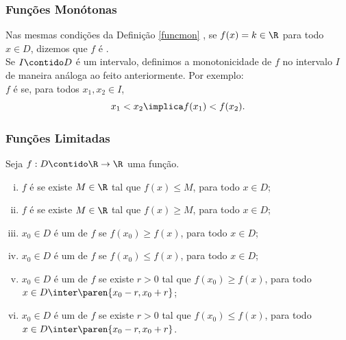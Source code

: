 \documentclass[10pt]{beamer}
\begin{document}
\begin{frame}
\frametitle{Funções Monótonas} 



Nas mesmas condições da Definição \ref{funcmon} , se $f(x) = k \in
\R$ para todo $x \in D$, dizemos que $f$ é .\\ \pause
Se $I \contido D$ é um intervalo, definimos a monotonicidade de $f$
no intervalo $I$ de maneira análoga ao feito anteriormente. Por
exemplo: \\
$f$ é  se, para todos
$x_1, x_2 \in I$,
	$$x_1 < x_2 \implica f(x_1) < f(x_2).$$


\end{frame}




\begin{frame}
\frametitle{Funções Limitadas} 

\begin{definicao}
Seja $f: D \contido \R \to \R$ uma função.
\begin{enumerate}[(i)]
	\item $f$ é  se existe $M \in \R$ tal
	que $f(x) \leq M$, para todo $x \in D$;
	\item $f$ é  se existe $M \in \R$ tal
	que $f(x) \geq M$, para todo $x \in D$;
	\item $x_0 \in D$ é um  de $f$ se
	$f(x_0) \geq f(x)$, para todo $x \in D$;
	\item $x_0 \in D$ é um  de $f$ se
	$f(x_0) \leq f(x)$, para todo $x \in D$;
	\item $x_0 \in D$ é um  de $f$ se
	existe $r>0$ tal que $f(x_0) \geq f(x)$, para todo $x \in D \inter \paren{x_0 - r , x_0+r}$;
	\item $x_0 \in D$ é um  de $f$ se
	existe $r>0$ tal que $f(x_0) \leq f(x)$, para todo $x \in D \inter \paren{x_0 - r ,
	x_0+r}$.
\end{enumerate}
\end{definicao}

\end{frame}
\end{document}
